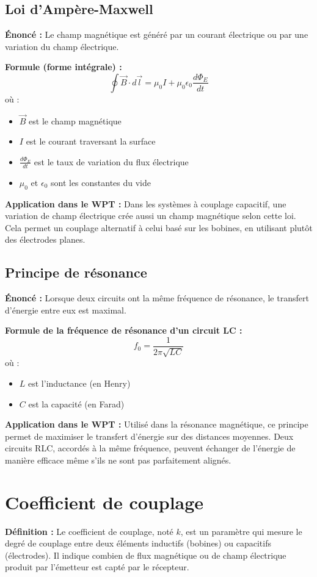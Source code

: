 \documentclass[12pt,a4paper,titlepage,notitlepage]{article}
\begin{document}
	\subsection{Loi d’Ampère-Maxwell}
	\textbf{Énoncé :} Le champ magnétique est généré par un courant électrique ou par une variation du champ électrique.
	
	\textbf{Formule (forme intégrale) :}
	\[
	\oint \vec{B} \cdot d\vec{l} = \mu_0 I + \mu_0 \epsilon_0 \frac{d\Phi_E}{dt}
	\]
	où :
	\begin{itemize}
		\item \(\vec{B}\) est le champ magnétique
		\item \(I\) est le courant traversant la surface
		\item \(\frac{d\Phi_E}{dt}\) est le taux de variation du flux électrique
		\item \(\mu_0\) et \(\epsilon_0\) sont les constantes du vide
	\end{itemize}
	
	\textbf{Application dans le WPT :} Dans les systèmes à couplage capacitif, une variation de champ électrique crée aussi un champ magnétique selon cette loi. Cela permet un couplage alternatif à celui basé sur les bobines, en utilisant plutôt des électrodes planes.
	
	\subsection{Principe de résonance}
	\textbf{Énoncé :} Lorsque deux circuits ont la même fréquence de résonance, le transfert d’énergie entre eux est maximal.
	
	\textbf{Formule de la fréquence de résonance d’un circuit LC :}
	\[
	f_0 = \frac{1}{2\pi\sqrt{LC}}
	\]
	où :
	\begin{itemize}
		\item \(L\) est l’inductance (en Henry)
		\item \(C\) est la capacité (en Farad)
	\end{itemize}
	
	\textbf{Application dans le WPT :} Utilisé dans la résonance magnétique, ce principe permet de maximiser le transfert d’énergie sur des distances moyennes. Deux circuits RLC, accordés à la même fréquence, peuvent échanger de l’énergie de manière efficace même s’ils ne sont pas parfaitement alignés.
	
	\section{Coefficient de couplage}
	\textbf{Définition :} Le coefficient de couplage, noté \(k\), est un paramètre qui mesure le degré de couplage entre deux éléments inductifs (bobines) ou capacitifs (électrodes). Il indique combien de flux magnétique ou de champ électrique produit par l’émetteur est capté par le récepteur.
	
\end{document}
